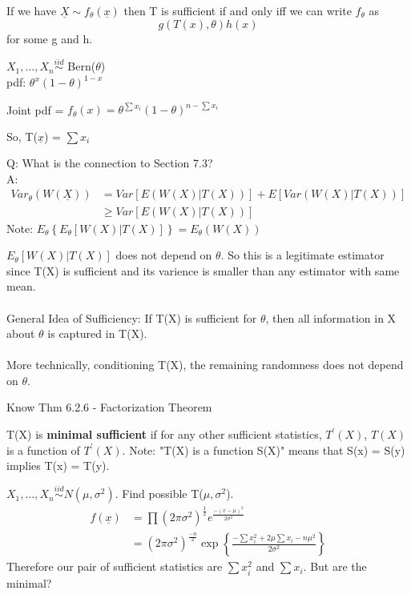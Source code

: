 \documentclass[11pt,fleqn]{book} %
\begin{document}
\begin{theorem}
	If we have $\underline{X} \sim f_\theta(\underline{x})$ then T is sufficient if and only iff we can write $f_\theta$ as
	$$g(T(x),\theta)h(x)$$
	for some g and h.
\end{theorem}

\begin{example}
	$X_1, \dots, X_n \stackrel{iid}{\sim}$ Bern($\theta$)\\
	pdf: $\theta^x(1-\theta)^{1-x}$

	Joint pdf = $f_\theta(x) = \theta^{\sum x_i}(1-\theta)^{n-\sum x_i}$

	So, T($\underline{x}$) = $\sum x_i$
\end{example}


Q: What is the connection to Section 7.3?\\
A: \begin{align*}
Var_\theta(W(\underline{X})) &= Var\left[E(W(X)|T(X))\right] + E\left[Var(W(X)|T(X)) \right]\\
&\ge Var\left[E(W(X)|T(X))\right]	
\end{align*} 
Note: $E_\theta \left\{E_\theta[W(X)|T(X)] \right\} = E_\theta(W(X))$

$E_\theta[W(X)|T(X)]$ does not depend on $\theta$. So this is a legitimate estimator since T(X) is sufficient and its varience is smaller than any estimator with same mean. \\
\\
General Idea of Sufficiency: If T(X) is sufficient for $\theta$, then all information in X about $\theta$ is captured in T(X). \\
\\
More technically, conditioning T(X), the remaining randomness does not depend on $\theta$.

\begin{remark}
	Know Thm 6.2.6 - Factorization Theorem
\end{remark}

\begin{definition}
	 T(X) is \textbf{minimal sufficient} if for any other sufficient statistics, $T^\prime(X)$, $T(X)$ is a function of $T^\prime(X)$.
	 Note: "T(X) is a function S(X)" means that S(x) = S(y) implies T(x) = T(y).
\end{definition}

\begin{example}
	 $X_1, \dots, X_n \stackrel{iid}{\sim} N(\mu,\sigma^2)$. Find possible T($\mu,\sigma^2$).\\
	 \begin{align*}
	 f(\underline{x}) &= \prod (2\pi\sigma^2)^{\frac{1}{2}} e^{\frac{-(x-\mu)^2}{2\sigma^2}}\\
	 &= (2\pi\sigma^2)^{\frac{-n}{2}}\exp\left\{\frac{-\sum x_i^2 + 2\mu \sum x_i - n\mu^2}{2\sigma^2}\right\}
	 \end{align*}
Therefore our pair of sufficient statistics are $\sum x_i^2$ and $\sum x_i$. But are the minimal?
\end{example}
\end{document}
